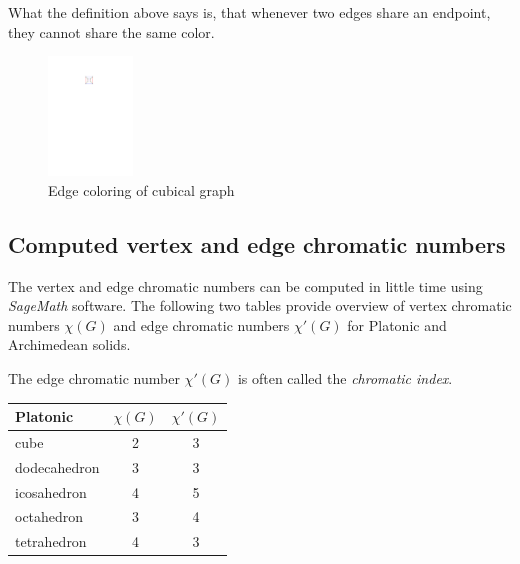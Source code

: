 What the definition above says is, that whenever two edges share an endpoint, they cannot share the same color. 

\begin{figure}[H]
    \centering
    \includegraphics[width=0.2\textwidth]{../Resources/Figs/cubical_edg_colr.pdf}
    \caption{Edge coloring of cubical graph}
    \label{fig:cubical_edge_coloring}
\end{figure}

\subsection{Computed vertex and edge chromatic numbers}

The vertex and edge chromatic numbers can be computed in little time using \textit{SageMath} software. The following two tables provide overview of vertex chromatic numbers $\chi(G)$ and edge chromatic numbers $\chi'(G)$ for Platonic and Archimedean solids.

\begin{highlight}
The edge chromatic number $\chi'(G)$ is often called the \textit{chromatic index}.
\end{highlight}

\begin{center}
\begin{tabular}{|l|c|c|}
\hline
Platonic & $\chi(G)$ & $\chi'(G)$ \\
\hline\hline
cube & 2 & 3 \\
\hline
dodecahedron & 3 & 3 \\
\hline
icosahedron & 4 & 5 \\
\hline
octahedron & 3 & 4 \\
\hline
tetrahedron & 4 & 3 \\
\hline
\end{tabular}
\end{center}

